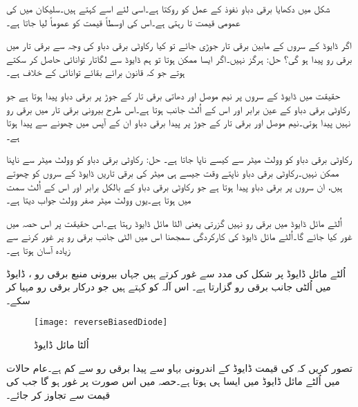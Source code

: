 شکل میں دکھایا برقی دباو  نفوذ کے عمل کو روکتا ہے۔اسی لئے اسے   کہتے ہیں۔سلیکان میں  کی عمومی  قیمت  تا  رہتی ہے۔اس کی اوسطاً قیمت کو عموماً  لیا جاتا ہے۔

اگر ڈایوڈ کے سروں کے مابین برقی تار جوڑی جائے تو کیا رکاوٹی برقی دباو کی وجہ سے برقی تار میں برقی رو پیدا ہو گی؟
حل:	ہرگز نہیں۔اگر ایسا ممکن ہوتا تو ہم ڈایوڈ سے لگاتار توانائی حاصل کر سکتے ہوتے جو کہ قانون برائے بقائے توانائی کے خلاف ہے۔


حقیقت میں ڈایوڈ کے سروں پر نیم موصل اور دھاتی برقی تار کے جوڑ  پر برقی دباو پیدا ہوتا ہے جو رکاوٹی برقی دباو کے عین برابر اور اس کے اُلٹ جانب ہوتا ہے۔اس طرح بیرونی برقی تار میں برقی رو نہیں پیدا ہوتی۔نیم موصل اور برقی تار کے جوڑ پر پیدا برقی دباو ان کے آپس میں چھونے سے پیدا ہوتا ہے۔ 	

رکاوٹی برقی دباو  کو وولٹ میٹر  سے کیسے ناپا جاتا ہے۔
حل:	رکاوٹی برقی دباو کو وولٹ میٹر سے ناپنا ممکن نہیں۔رکاوٹی برقی دباو ناپتے وقت جیسے ہی میٹر کی برقی تاریں ڈایوڈ کے سروں کو چھوتے ہیں، ان سروں پر  برقی دباو پیدا ہوتا ہے جو رکاوٹی برقی دباو کے بالکل برابر اور اس کے اُلٹ سمت میں ہوتا ہے۔یوں وولٹ میٹر صفر وولٹ جواب دیتا ہے۔



	اُلٹے مائل ڈایوڈ   میں برقی رو نہیں گزرتی یعنی الٹا مائل  ڈایوڈ   رہتا ہے۔اس حقیقت پر اس حصہ میں غور کیا جائے گا۔اُلٹے مائل ڈایوڈ کی کارکردگی سمجھنا اس میں الٹی جانب برقی رو پر غور کرنے سے زیادہ آسان ہوتا ہے۔

اُلٹے مائل ڈایوڈ   پر شکل   کی مدد سے غور کرتے ہیں جہاں بیرونی منبع برقی رو ، ڈایوڈ میں اُلٹی جانب برقی رو  گزارتا ہے۔ اس آلہ کو کہتے ہیں جو درکار برقی رو مہیا کر سکے۔
\begin{figure}
\centering
\texttt{[image: reverseBiasedDiode]}
\caption{ اُلٹا مائل ڈایوڈ}
\label{شکل_اُلٹا_مائل_ڈایوڈ}
\end{figure}
تصور کریں کہ  کی قیمت ڈایوڈ کے اندرونی بہاو سے پیدا برقی رو  سے کم ہے۔عام حالات میں اُلٹے مائل ڈایوڈ میں ایسا ہی ہوتا ہے۔حصہ   میں اس صورت پر غور ہو گا جب  کی قیمت  سے تجاوز کر جائے۔

